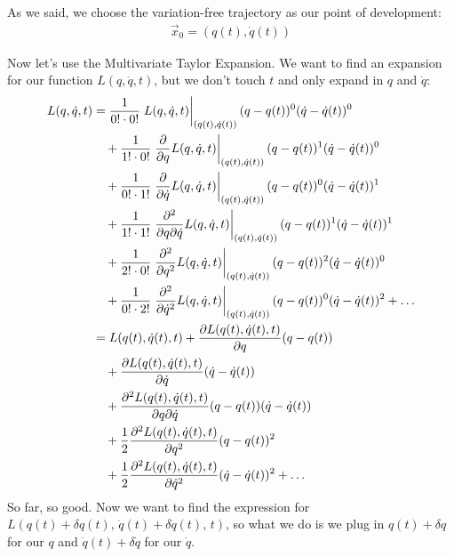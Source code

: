 \documentclass{article}
\begin{document}
	As we said, we choose the variation-free trajectory as our point of development: 
	\begin{align}
		\vec{x}_0=(q(t), \dot{q}(t)) 
	\end{align}
	
	Now let's use the Multivariate Taylor Expansion. We want to find an expansion for our function $L(q,\dot{q},t)$, but we don't touch $t$ and only expand in $q$ and $\dot{q}$:
	\begin{align*}
		L(q, \dot{q}, t) &= \frac{1}{0!\cdot 0!}\eval{L(q, \dot{q}, t)}_{(q(t), \dot{q}(t))}(q-q(t))^0(\dot{q}-\dot{q}(t))^0 \\
		&\quad + \frac{1}{1!\cdot 0!}\eval{\frac{\partial}{\partial q}L(q, \dot{q}, t)}_{(q(t), \dot{q}(t))}(q-q(t))^1(\dot{q}-\dot{q}(t))^0 \\
		&\quad + \frac{1}{0!\cdot 1!}\eval{\frac{\partial}{\partial \dot{q}}L(q, \dot{q}, t)}_{(q(t), \dot{q}(t))}(q-q(t))^0(\dot{q}-\dot{q}(t))^1 \\
		&\quad + \frac{1}{1!\cdot 1!}\eval{\frac{\partial^2}{\partial q\partial\dot{q}}L(q, \dot{q}, t)}_{(q(t), \dot{q}(t))}(q-q(t))^1(\dot{q}-\dot{q}(t))^1 \\
		&\quad + \frac{1}{2!\cdot 0!}\eval{\frac{\partial^2}{\partial q^2}L(q, \dot{q}, t)}_{(q(t), \dot{q}(t))}(q-q(t))^2(\dot{q}-\dot{q}(t))^0 \\
		&\quad + \frac{1}{0!\cdot 2!}\eval{\frac{\partial^2}{\partial \dot{q}^2}L(q, \dot{q}, t)}_{(q(t), \dot{q}(t))}(q-q(t))^0(\dot{q}-\dot{q}(t))^2+\dots \\
		&=L(q(t),\dot{q}(t),t)+\frac{\partial L(q(t),\dot{q}(t), t)}{\partial q}(q-q(t)) \\
		&\quad + \frac{\partial L(q(t),\dot{q}(t), t)}{\partial \dot{q}}(\dot{q}-\dot{q}(t)) \\
		&\quad + \frac{\partial^2 L(q(t),\dot{q}(t), t)}{\partial q \partial \dot{q}}(q-q(t))(\dot{q}-\dot{q}(t)) \\
		&\quad + \frac{1}{2}\frac{\partial^2 L(q(t),\dot{q}(t), t)}{\partial q^2}(q-q(t))^2 \\
		&\quad + \frac{1}{2}\frac{\partial^2 L(q(t),\dot{q}(t), t)}{\partial \dot{q}^2}(\dot{q}-\dot{q}(t))^2+\dots
	\end{align*}
	So far, so good. Now we want to find the expression for $L(q(t)+\delta q(t),\,\dot{q}(t)+\delta \dot{q}(t),\, t)$, so what we do is we plug in $q(t)+\delta q$ for our $q$ and $\dot{q}(t)+\delta \dot{q}$ for our $\dot{q}$. 
\end{document}
